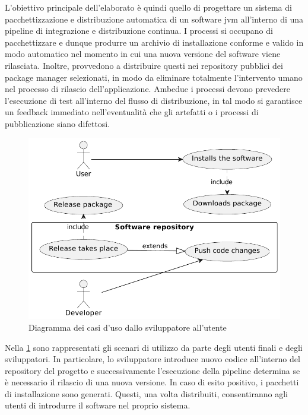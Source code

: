 L'obiettivo principale dell'elaborato è quindi quello di progettare un sistema di pacchettizzazione e distribuzione automatica di un software \ac{jvm} all'interno di una pipeline di integrazione e distribuzione continua. I processi si occupano di pacchettizzare e dunque produrre un archivio di installazione conforme e valido in modo automatico nel momento in cui una nuova versione del software viene rilasciata. Inoltre, provvedono a distribuire questi nei repository pubblici dei package manager selezionati, in modo da eliminare totalmente l'intervento umano nel processo di rilascio dell'applicazione. Ambedue i processi devono prevedere l'esecuzione di test all'interno del flusso di distribuzione, in tal modo si garantisce un feedback immediato nell'eventualità che gli artefatti o i processi di pubblicazione siano difettosi.
\begin{figure}[htb]
	\centering
	\includegraphics[width=.75\linewidth]{figures/use-case-diagram.pdf}
	\caption{Diagramma dei casi d'uso dallo sviluppatore all'utente}
	\label{fig:use-case-diagram}
\end{figure}
Nella \cref{fig:use-case-diagram} sono rappresentati gli scenari di utilizzo da parte degli utenti finali e degli sviluppatori. In particolare, lo sviluppatore introduce nuovo codice all'interno del repository del progetto e successivamente l'esecuzione della pipeline determina se è necessario il rilascio di una nuova versione. In caso di esito positivo, i pacchetti di installazione sono generati. Questi, una volta distribuiti, consentiranno agli utenti di introdurre il software nel proprio sistema.